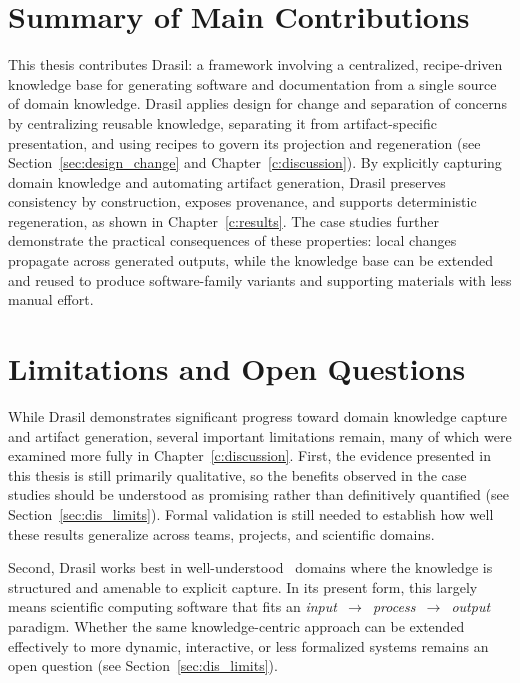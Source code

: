 \section{Summary of Main Contributions}

This thesis contributes Drasil: a framework involving a centralized, 
recipe-driven knowledge base for generating software and documentation 
from a single source of domain knowledge. Drasil applies design for change and 
separation of concerns by centralizing reusable knowledge, separating it from 
artifact-specific presentation, and using recipes to govern its projection and 
regeneration (see Section~\ref{sec:design_change} and 
Chapter~\ref{c:discussion}). By explicitly capturing domain knowledge and 
automating artifact generation, Drasil preserves consistency by construction, 
exposes provenance, and supports deterministic regeneration, as shown in
Chapter~\ref{c:results}. The case studies further demonstrate the practical 
consequences of these properties: local changes propagate across generated 
outputs, while the knowledge base can be extended and reused to produce
software-family variants and supporting materials with less manual effort.


\section{Limitations and Open Questions}

While Drasil demonstrates significant progress toward domain knowledge
capture and artifact generation, several important limitations remain, many of
which were examined more fully in Chapter~\ref{c:discussion}. First, the
evidence presented in this thesis is still primarily qualitative, so the
benefits observed in the case studies should be understood as promising rather
than definitively quantified (see Section~\ref{sec:dis_limits}). Formal validation is still needed to establish
how well these results generalize across teams, projects, and scientific
domains.

Second, Drasil works best in well-understood~\citep{CaretteEtAl2023} domains
where the knowledge is structured and amenable to explicit capture. In its present
form, this largely means scientific computing software that fits an 
\mbox{\emph{input~$\rightarrow$~process~$\rightarrow$~output}} paradigm. 
Whether the same
knowledge-centric approach can be extended effectively to more dynamic,
interactive, or less formalized systems remains an open question (see Section~\ref{sec:dis_limits}).

